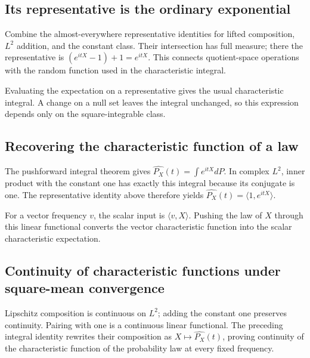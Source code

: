\documentclass[11pt,a4paper]{report}
\begin{document}
\subsection{\texorpdfstring{Its representative is the ordinary exponential}{Its representative is the ordinary exponential}}
\label{report-step-UnadjustedLangevin-LpCharacteristic-lean-5}


Combine the almost-everywhere representative identities for lifted composition, \(L^2\) addition, and the constant class. Their intersection has full measure; there the representative is \((e^{itX}-1)+1=e^{itX}\). This connects quotient-space operations with the random function used in the characteristic integral.



Evaluating the expectation on a representative gives the usual characteristic integral. A change on a null set leaves the integral unchanged, so this expression depends only on the square-integrable class.

\subsection{\texorpdfstring{Recovering the characteristic function of a law}{Recovering the characteristic function of a law}}
\label{report-step-UnadjustedLangevin-LpCharacteristic-lean-6}


The pushforward integral theorem gives \(\widehat{P_X}(t)=\int e^{itX}dP\). In complex \(L^2\), inner product with the constant one has exactly this integral because its conjugate is one. The representative identity above therefore yields \(\widehat{P_X}(t)=\langle1,e^{itX}\rangle\).



For a vector frequency \(v\), the scalar input is \(\langle v,X\rangle\). Pushing the law of \(X\) through this linear functional converts the vector characteristic function into the scalar characteristic expectation.

\subsection{\texorpdfstring{Continuity of characteristic functions under square-mean convergence}{Continuity of characteristic functions under square-mean convergence}}
\label{report-step-UnadjustedLangevin-LpCharacteristic-lean-7}


Lipschitz composition is continuous on \(L^2\); adding the constant one preserves continuity. Pairing with one is a continuous linear functional. The preceding integral identity rewrites their composition as \(X\mapsto\widehat{P_X}(t)\), proving continuity of the characteristic function of the probability law at every fixed frequency.
\end{document}
